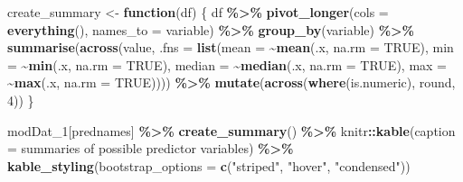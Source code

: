 \documentclass[
]{article}
\newenvironment{Shaded}{\begin{snugshade}}{\end{snugshade}}
\newcommand{\AttributeTok}[1]{\textcolor[rgb]{0.13,0.29,0.53}{#1}}
\newcommand{\ConstantTok}[1]{\textcolor[rgb]{0.56,0.35,0.01}{#1}}
\newcommand{\ControlFlowTok}[1]{\textcolor[rgb]{0.13,0.29,0.53}{\textbf{#1}}}
\newcommand{\DecValTok}[1]{\textcolor[rgb]{0.00,0.00,0.81}{#1}}
\newcommand{\FunctionTok}[1]{\textcolor[rgb]{0.13,0.29,0.53}{\textbf{#1}}}
\newcommand{\NormalTok}[1]{#1}
\newcommand{\OtherTok}[1]{\textcolor[rgb]{0.56,0.35,0.01}{#1}}
\newcommand{\SpecialCharTok}[1]{\textcolor[rgb]{0.81,0.36,0.00}{\textbf{#1}}}
\newcommand{\StringTok}[1]{\textcolor[rgb]{0.31,0.60,0.02}{#1}}
\begin{document}
\begin{Shaded}
\begin{Highlighting}[]
\NormalTok{create\_summary }\OtherTok{\textless{}{-}} \ControlFlowTok{function}\NormalTok{(df) \{}
\NormalTok{  df }\SpecialCharTok{\%\textgreater{}\%} 
    \FunctionTok{pivot\_longer}\NormalTok{(}\AttributeTok{cols =} \FunctionTok{everything}\NormalTok{(),}
                 \AttributeTok{names\_to =} \StringTok{\textquotesingle{}variable\textquotesingle{}}\NormalTok{) }\SpecialCharTok{\%\textgreater{}\%} 
    \FunctionTok{group\_by}\NormalTok{(variable) }\SpecialCharTok{\%\textgreater{}\%} 
    \FunctionTok{summarise}\NormalTok{(}\FunctionTok{across}\NormalTok{(value, }\AttributeTok{.fns =} \FunctionTok{list}\NormalTok{(}\AttributeTok{mean =} \SpecialCharTok{\textasciitilde{}}\FunctionTok{mean}\NormalTok{(.x, }\AttributeTok{na.rm =} \ConstantTok{TRUE}\NormalTok{), }\AttributeTok{min =} \SpecialCharTok{\textasciitilde{}}\FunctionTok{min}\NormalTok{(.x, }\AttributeTok{na.rm =} \ConstantTok{TRUE}\NormalTok{), }
                                        \AttributeTok{median =} \SpecialCharTok{\textasciitilde{}}\FunctionTok{median}\NormalTok{(.x, }\AttributeTok{na.rm =} \ConstantTok{TRUE}\NormalTok{), }\AttributeTok{max =} \SpecialCharTok{\textasciitilde{}}\FunctionTok{max}\NormalTok{(.x, }\AttributeTok{na.rm =} \ConstantTok{TRUE}\NormalTok{)))) }\SpecialCharTok{\%\textgreater{}\%} 
    \FunctionTok{mutate}\NormalTok{(}\FunctionTok{across}\NormalTok{(}\FunctionTok{where}\NormalTok{(is.numeric), round, }\DecValTok{4}\NormalTok{))}
\NormalTok{\}}

\NormalTok{modDat\_1[prednames] }\SpecialCharTok{\%\textgreater{}\%} 
  \FunctionTok{create\_summary}\NormalTok{() }\SpecialCharTok{\%\textgreater{}\%} 
\NormalTok{  knitr}\SpecialCharTok{::}\FunctionTok{kable}\NormalTok{(}\AttributeTok{caption =} \StringTok{\textquotesingle{}summaries of possible predictor variables\textquotesingle{}}\NormalTok{) }\SpecialCharTok{\%\textgreater{}\%}
\FunctionTok{kable\_styling}\NormalTok{(}\AttributeTok{bootstrap\_options =} \FunctionTok{c}\NormalTok{(}\StringTok{"striped"}\NormalTok{, }\StringTok{"hover"}\NormalTok{, }\StringTok{"condensed"}\NormalTok{)) }
\end{Highlighting}
\end{Shaded}
\end{document}

